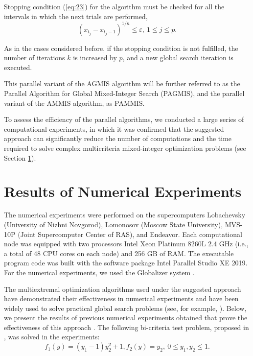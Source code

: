 \documentclass{svproc}
\begin{document}
Stopping condition (\ref{eq:23}) for the algorithm must be checked for all the intervals in which the next trials are performed,
\begin{equation}\label{eq:26}
(x_{t_j} - x_{t_j-1})^{1/n} \leq \varepsilon,\ 1 \leq j \leq p.
\end{equation}

As in the cases considered before, if the stopping condition is not fulfilled, the number of iterations $k$ is increased by $p$, and a new global search iteration is executed.

This parallel variant of the AGMIS algorithm will be further referred to as the Parallel Algorithm for Global Mixed-Integer Search (PAGMIS), and the parallel variant of the AMMIS algorithm, as PAMMIS.

To assess the efficiency of the parallel algorithms, we conducted a large series of computational experiments, in which it was confirmed that the suggested approach can significantly reduce the number of computations and the time required to solve complex multicriteria mixed-integer optimization problems (see Section \ref{sec:5}).

\section{Results of Numerical Experiments}\label{sec:5}

The numerical experiments were performed on the supercomputers Lobachevsky (University of Nizhni Novgorod), Lomonosov (Moscow State University), MVS-10P (Joint Supercomputer Center of RAS), and Endeavor. Each computational node was equipped with two processors Intel Xeon Platinum 8260L 2.4 GHz (i.e., a total of 48 CPU cores on each node) and 256 GB of RAM. The executable program code was built with the software package Intel Parallel Studio XE 2019. For the numerical experiments, we used the Globalizer system \cite{c41}.

The multiextremal optimization algorithms used under the suggested approach have demonstrated their effectiveness in numerical experiments and have been widely used to solve practical global search problems (see, for example, \cite{c20,c21,c22,c23}). Below, we present the results of previous numerical experiments obtained that prove the effectiveness of this approach \cite{c21}. The following bi-criteria test problem, proposed in \cite{c42}, was solved in the experiments:
\begin{equation}\label{eq:27}
f_1(y)=(y_1-1) y_2^2+1,f_2 (y)=y_2,\ 0 \leq y_1, y_2 \leq 1.
\end{equation}
\end{document}
